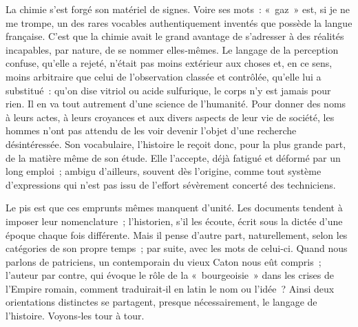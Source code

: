 \documentclass[french,twoside]{book} %
\newcommand{\astermono}{\medskip\centerline{\color{rubric}\large\selectfont{\syms ✻}}\medskip\par}%
\begin{document}
\noindent La chimie s’est forgé son matériel de signes. Voire ses mots : « gaz » est, si je ne me trompe, un des rares vocables authentiquement inventés que possède la langue française. C’est que la chimie avait le grand avan­tage de s’adresser à des réalités incapables, par nature, de se nommer elles‑mêmes. Le langage de la perception confuse, qu’elle a rejeté, n’était  
\label{p80} pas moins extérieur aux choses et, en ce sens, moins arbitraire que celui de l’observation classée et contrôlée, qu’elle lui a substitué : qu’on dise vitriol ou acide sulfurique, le corps n’y est jamais pour rien. Il en va tout autrement d’une science de l’humanité. Pour donner des noms à leurs actes, à leurs croyances et aux divers aspects de leur vie de société, les hommes n’ont pas attendu de les voir devenir l’objet d’une recherche désintéressée. Son vocabulaire, l’histoire le reçoit donc, pour la plus grande part, de la matière même de son étude. Elle l’accepte, déjà fatigué et déformé par un long emploi ; ambigu d’ailleurs, souvent dès l’origine, comme tout système d’expressions qui n’est pas issu de l’effort sévère­ment concerté des techniciens.\par
Le pis est que ces emprunts mêmes manquent d’unité. Les documents tendent à imposer leur nomenclature ; l’historien, s’il les écoute, écrit sous la dictée d’une époque chaque fois différente. Mais il pense d’autre part, naturellement, selon les catégories de son propre temps ; par suite, avec les mots de celui-ci. Quand nous parlons de patriciens, un contem­porain du vieux Caton nous eût compris ; l’auteur par contre, qui évoque le rôle de la « bourgeoisie » dans les crises de l’Empire romain, comment traduirait‑il en latin le nom ou l’idée ? Ainsi deux orientations distinctes se partagent, presque nécessairement, le langage de l’histoire. Voyons‑les tour à tour.\par

\astermono
\end{document}
